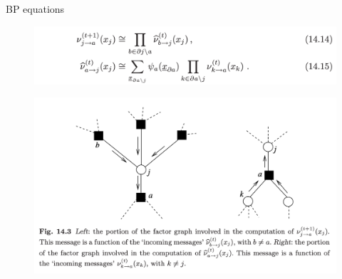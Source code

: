 \documentclass[UTF8]{beamer}
\begin{document}
\begin{frame}{BP equations}
  \begin{minipage}[c]{0.9\linewidth}
    \begin{figure}
      \centering
      \includegraphics[width=0.9\linewidth]{./fig/BP_equations.png}
    \end{figure}
  \end{minipage}
  \vfill
  \begin{minipage}[c]{0.9\linewidth}
    \begin{figure}
      \centering
      \includegraphics[width=0.9\linewidth]{./fig/Factor_graph.png}
    \end{figure}
  \end{minipage}
\end{frame}
\end{document}
